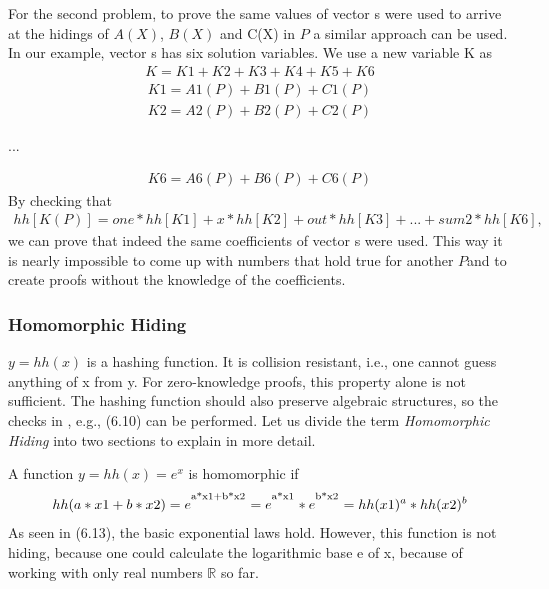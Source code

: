 For the second problem, to prove the same values of vector s were used to arrive at the hidings of \(A(X)\), \(B(X)\) and C(X) in \(P\) a similar approach can be used. In our example, vector s has six solution variables. We use a new variable K as
\begin{align}
    K = K1 + K2 + K3 + K4 + K5 + K6
\end{align}
\begin{align*}
    K1 = A1(P) + B1(P) + C1(P)\\K2 = A2(P) + B2(P) + C2(P)
\end{align*}
\begin{center}
    ... \\
\end{center}
\begin{align*}
    K6 = A6(P) + B6(P) + C6(P)
\end{align*}
By checking that 
\begin{align}
    hh[K(P)] = one*hh[K1] + x * hh[K2] + out * hh[K3] + ... + sum2 * hh[K6],
\end{align}
we can prove that indeed the same coefficients of vector s were used. This way it is nearly impossible to come up with numbers that hold true for another \(P\)and to create proofs without the knowledge of the coefficients.

\subsubsection{Homomorphic Hiding}

\(y = hh(x)\) is a hashing function. It is collision resistant, i.e., one cannot guess anything of x from y. For zero-knowledge proofs, this property alone is not sufficient. The hashing function should also preserve algebraic structures, so the checks in , e.g., (6.10) can be performed. Let us divide the term \textit{Homomorphic Hiding} into two sections to explain in more detail.

A function \(y = hh(x) = e^x\) is homomorphic if
\begin{align}
    hh(a*x1 + b*x2) = e^\textsuperscript{a*x1+b*x2} = e^\textsuperscript{a*x1} * e^\textsuperscript{b*x2} = hh(x1)^a * hh(x2)^b
\end{align}
As seen in (6.13), the basic exponential laws hold. However, this function is not hiding, because one could calculate the logarithmic base e of x, because of working with only real numbers \begin{math}\mathbb{R}  
\end{math} so far.

